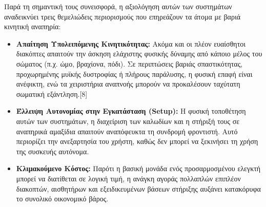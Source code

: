 \documentclass[twoside, a4paper, 11pt]{article}
\begin{document}
Παρά τη σημαντική τους συνεισφορά, η αξιολόγηση αυτών των συστημάτων αναδεικνύει τρεις θεμελιώδεις περιορισμούς που επηρεάζουν τα άτομα με βαριά κινητική αναπηρία:
\begin{itemize}
    \item \textbf{Απαίτηση Υπολειπόμενης Κινητικότητας:} Ακόμα και οι πλέον ευαίσθητοι διακόπτες απαιτούν την άσκηση ελάχιστης φυσικής δύναμης από κάποιο μέλος του σώματος (π.χ. ώμο, βραχίονα, πόδι). Σε περιπτώσεις βαριάς σπαστικότητας, προχωρημένης μυϊκής δυστροφίας ή πλήρους παράλυσης, η φυσική επαφή είναι ανέφικτη, ενώ τα χειριστήρια αναπνοής μπορούν να προκαλέσουν ταχύτατη σωματική εξάντληση.[8]
    \item \textbf{Έλλειψη Αυτονομίας στην Εγκατάσταση (Setup):} Η φυσική τοποθέτηση αυτών των συστημάτων, η διαχείριση των καλωδίων και η στήριξή τους σε αναπηρικά αμαξίδια απαιτούν αναπόφευκτα τη συνδρομή φροντιστή. Αυτό περιορίζει την ανεξαρτησία του χρήστη, καθώς δεν μπορεί να ξεκινήσει τη χρήση της συσκευής αυτόνομα.
    \item \textbf{Κλιμακούμενο Κόστος:} Παρότι η βασική μονάδα ενός προσαρμοσμένου ελεγκτή μπορεί να διατίθεται σε λογική τιμή, η ανάγκη αγοράς πολλαπλών επιπλέον διακοπτών, αισθητήρων και εξειδικευμένων βάσεων στήριξης αυξάνει κατακόρυφα το συνολικό οικονομικό βάρος.
\end{itemize}
\end{document}
